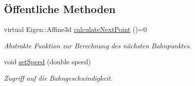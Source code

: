 \subsection*{Öffentliche Methoden}
\begin{DoxyCompactItemize}
\item 
virtual Eigen\-::\-Affine3d \hyperlink{classITrajectory_a7baff9fb2fc20987e9469d736a90406b}{calculate\-Next\-Point} ()=0
\begin{DoxyCompactList}\small\item\em Abstrakte Funktion zur Berechnung des nächsten Bahnpunktes. \end{DoxyCompactList}\item 
void \hyperlink{classITrajectory_a5067fb507df5d1e92249389325752fd6}{set\-Speed} (double speed)
\begin{DoxyCompactList}\small\item\em Zugriff auf die Bahngeschwindigkeit. \end{DoxyCompactList}\end{DoxyCompactItemize}
